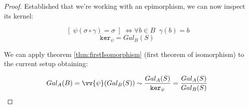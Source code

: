 \begin{proof}
    Established that we're working with an epimorphism, we can now inspect its kernel:

    $$ \; [ \; \psi(\sigma \circ \gamma) = \sigma \; ] \; \iff \forall b \in B\;\; \gamma(b) = b $$
    $$ \texttt{ker}_{\psi} = Gal_{B}(S) $$
    \vspace{0.2em}

    We can apply theorem \ref{thm:firstIsomorphism} (first theorem of isomorphism) 
    to the current setup obtaining:

    $$ Gal_{A}(B) = \vv{\psi}(Gal_{B}(S)) 
    \sim \frac{Gal_{A}(S)}{\texttt{ker}_{\psi}} 
    = \frac{Gal_{A}(S)}{Gal_{B}(S)} $$

\end{proof}

\newpage